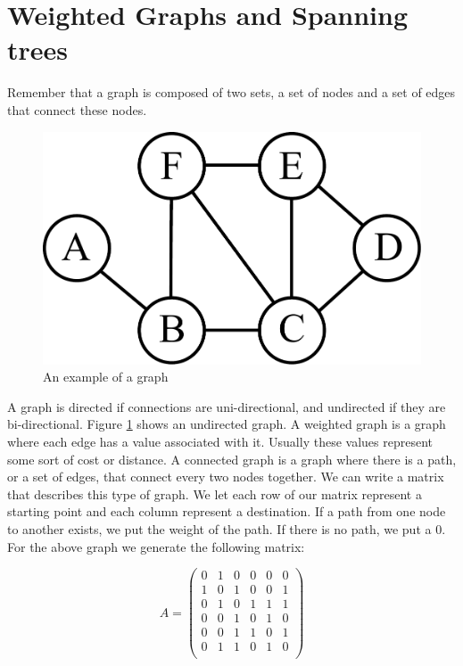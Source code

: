 \label{Ch:Kruskal}


\section*{Weighted Graphs and Spanning trees}

Remember that a graph is composed of two sets, a set of nodes and a set of edges that connect these nodes. 

\begin{figure}[H]
\includegraphics[width = .4\textwidth]{graph1.pdf}
\caption{An example of a graph}
\label{mst:graph1}
\end{figure}

A graph is directed if connections are uni-directional, and undirected if they are bi-directional.
Figure \ref{mst:graph1} shows an undirected graph.
A weighted graph is a graph where each edge has a value associated with it.
Usually these values represent some sort of cost or distance.
A connected graph is a graph where there is a path, or a set of edges, that connect every two nodes together.
We can write a matrix that describes this type of graph.
We let each row of our matrix represent a starting point and each column represent a destination.
If a path from one node to another exists, we put the weight of the path.
If there is no path, we put a 0.
For the above graph we generate the following matrix:

\[
A = \begin{pmatrix}
0 & 1 & 0 & 0 & 0 & 0\\
1 & 0 & 1 & 0 & 0 & 1\\
0 & 1 & 0 & 1 & 1 & 1\\
0 & 0 & 1 & 0 & 1 & 0\\
0 & 0 & 1 & 1 & 0 & 1\\
0 & 1 & 1 & 0 & 1 & 0\\
\end{pmatrix}
\]

